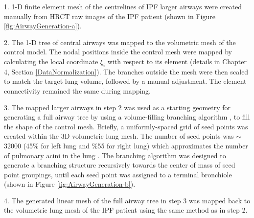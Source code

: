 1. 1-D finite element mesh of the centrelines of IPF larger airways were created manually from HRCT raw images of the IPF patient (shown in Figure \ref{fig:AirwayGeneration-a}).

2. The 1-D tree of central airways was mapped to the volumetric mesh of the control model. The nodal positions inside the control mesh were mapped by calculating the local coordinate $\xi_{i}$ with respect to its element (details in Chapter 4, Section \ref{DataNormalization}). The branches outside the mesh were then scaled to match the target lung volume, followed by a manual adjustment. The element connectivity remained the same during mapping.

3. The mapped larger airways in step 2 was used as a starting geometry for generating a full airway tree by using a volume-filling branching algorithm \citep{tawhai2004ct}, to fill the shape of the control mesh. Briefly, a uniformly-spaced grid of seed points was created within the 3D volumetric lung mesh. The number of seed points was $\sim$ 32000 (45\% for left lung and \%55 for right lung) which approximates the number of pulmonary acini in the lung \citep{haefeli1988morphometry}. The branching algorithm was designed to generate a branching structure recursively towards the center of mass of seed point groupings, until each seed point was assigned to a terminal bronchiole (shown in Figure \ref{fig:AirwayGeneration-b}). 

4. The generated linear mesh of the full airway tree in step 3 was mapped back to the volumetric lung mesh of the IPF patient using the same method as in step 2.

